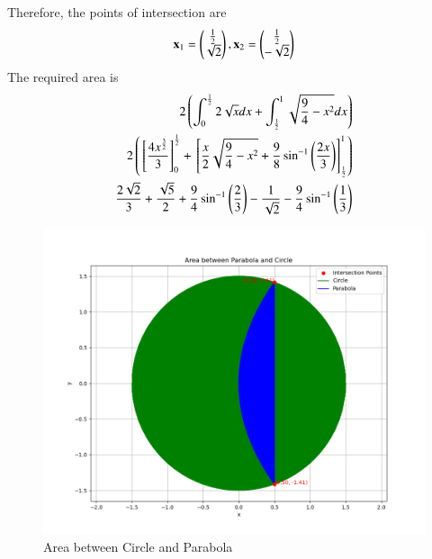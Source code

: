 \documentclass[journal]{IEEEtran}
\begin{document}
Therefore, the points of intersection are
\begin{align}
   \mathbf{x}_1 = \begin{pmatrix}\frac{1}{2} \\ \sqrt{2}\end{pmatrix}, \mathbf{x}_2 = \begin{pmatrix}\frac{1}{2} \\ -\sqrt{2}\end{pmatrix}
   \end{align}
The required area is
\begin{align}
    2\left(\int_{0}^{\frac{1}{2}}2\sqrt{x}dx + \int_{\frac{1}{2}}^{1}\sqrt{\frac{9}{4} - x^2}dx\right) \\
    2\left({}\left[\frac{4x^{\frac{3}{2}}}{3}\right]_0^{\frac{1}{2}} + {}\left[\frac{x}{2}\sqrt{\frac{9}{4} - x^2} + \frac{9}{8}\sin^{-1}{\left(\frac{2x}{3}\right)}\right]_{\frac{1}{2}}^1\right) \\
    \frac{2\sqrt{2}}{3} + \frac{\sqrt{5}}{2} + \frac{9}{4}\sin^{-1}\left(\frac{2}{3}\right) - \frac{1}{\sqrt{2}} - \frac{9}{4}\sin^{-1}\left(\frac{1}{3}\right)
\end{align}
\begin{figure}[h!]
   \centering
   \includegraphics[width=0.7\linewidth]{figs/area.png}
	\caption{Area between Circle and Parabola}
   \end{figure}
\end{document}
